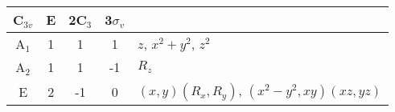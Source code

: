 \begin{tabular}{|c|c|c|c|l|}
\hline
C$_{3v}$ & E & 2C$_3$ & 3$\sigma_v$ &  \\ \hline
A$_1$ & 1 & 1 & 1 & $z$, $x^2+y^2$, $z^2$ \\ 
A$_2$ & 1 & 1 & -1 & $R_z$ \\ 
E & 2 & -1 & 0 & $(x,y)(R_x,R_y)$, $(x^2-y^2,xy)(xz,yz)$ \\ \hline
\end{tabular}